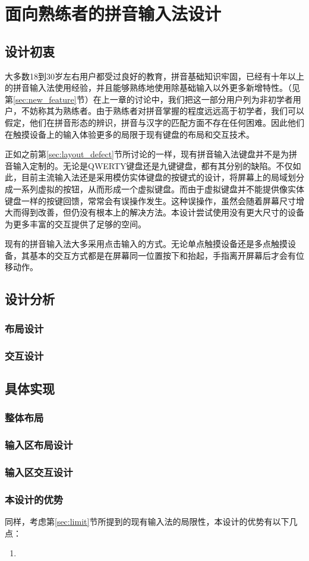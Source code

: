 \chapter{面向熟练者的拼音输入法设计}
  \section{设计初衷}

  大多数18到30岁左右用户都受过良好的教育，拼音基础知识牢固，已经有十年以上的拼音输入法使用经验，并且能够熟练地使用除基础输入以外更多新增特性。（见第\ref{sec:new_feature}节）在上一章的讨论中，我们把这一部分用户列为非初学者用户，不妨称其为熟练者。由于熟练者对拼音掌握的程度远远高于初学者，我们可以假定，他们在拼音形态的辨识，拼音与汉字的匹配方面不存在任何困难。因此他们在触摸设备上的输入体验更多的局限于现有键盘的布局和交互技术。

  正如之前第\ref{sec:layout_defect}节所讨论的一样，现有拼音输入法键盘并不是为拼音输入定制的。无论是QWERTY键盘还是九键键盘，都有其分别的缺陷。不仅如此，目前主流输入法还是采用模仿实体键盘的按键式的设计，将屏幕上的局域划分成一系列虚拟的按钮，从而形成一个虚拟键盘。而由于虚拟键盘并不能提供像实体键盘一样的按键回馈，常常会有误操作发生。这种误操作，虽然会随着屏幕尺寸增大而得到改善，但仍没有根本上的解决方法。本设计尝试使用没有更大尺寸的设备为更多丰富的交互提供了足够的空间。

  现有的拼音输入法大多采用点击输入的方式。无论单点触摸设备还是多点触摸设备，其基本的交互方式都是在屏幕同一位置按下和抬起，手指离开屏幕后才会有位移动作。

  \section{设计分析}
  \subsection{布局设计}

  \subsection{交互设计}

  \section{具体实现}
  \subsection{整体布局}
  \subsection{输入区布局设计}
  \subsection{输入区交互设计}

  \subsection{本设计的优势}

  同样，考虑第\ref{sec:limit}节所提到的现有输入法的局限性，本设计的优势有以下几点：

  \begin{enumerate}
  \item

  \end{enumerate}
